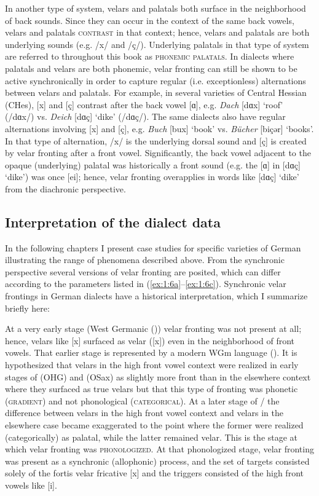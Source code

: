 In another type of system, velars and palatals both surface in the neighborhood of back sounds. Since they can occur in the context of the same back vowels, velars and palatals \textsc{contrast} in that context; hence, velars and palatals are both underlying sounds (e.g. /x/ and /ç/). Underlying palatals in that type of system are referred to throughout this book as \textsc{phonemic} \textsc{palatals}. In dialects where palatals and velars are both phonemic, velar fronting can still be shown to be active synchronically in order to capture regular (i.e. exceptionless) alternations between velars and palatals. For example, in several varieties of Central Hessian (CHes), [x] and [ç] contrast after the back vowel [ɑ], e.g. \textit{Dach} [dɑx] ‘roof’ (/dɑx/) vs. \textit{Deich} [dɑç] ‘dike’ (/dɑç/). The same dialects also have regular alternations involving [x] and [ç], e.g. \textit{Buch} [bux] ‘book’ vs. \textit{Bücher} [biçər] ‘books’. In that type of alternation, /x/ is the underlying dorsal sound and [ç] is created by velar fronting after a front vowel. Significantly, the back vowel adjacent to the opaque (underlying) palatal was historically a front sound (e.g. the [ɑ] in [dɑç] ‘dike’) was once [ei]; hence, velar fronting overapplies in words like [dɑç] ‘dike’ from the diachronic perspective.

\subsection{Interpretation of the dialect data}\label{sec:1.4.2}

In the following chapters I present case studies for specific varieties of German illustrating the range of phenomena described above. From the synchronic perspective several versions of velar fronting are posited, which can differ according to the parameters listed in (\ref{ex:1:6a}--\ref{ex:1:6c}). Synchronic velar frontings in German dialects have a historical interpretation, which I summarize briefly here:

At a very early stage (West Germanic ()) velar fronting was not present at all; hence, velars like [x] surfaced as velar ([x]) even in the neighborhood of front vowels. That earlier stage is represented by a modern WGm language (). It is hypothesized that velars in the high front vowel context were realized in early stages of  (OHG) and  (OSax) as slightly more front than in the elsewhere context where they surfaced as true velars but that this type of fronting was phonetic (\textsc{gradient}) and not phonological (\textsc{categorical}). At a later stage of / the difference between velars in the high front vowel context and velars in the elsewhere case became exaggerated to the point where the former were realized (categorically) as palatal, while the latter remained velar. This is the stage at which velar fronting was \textsc{phonologized}. At that phonologized stage, velar fronting was present as a synchronic (allophonic) process, and the set of targets consisted solely of the fortis velar fricative [x] and the triggers consisted of the high front vowels like [i].

